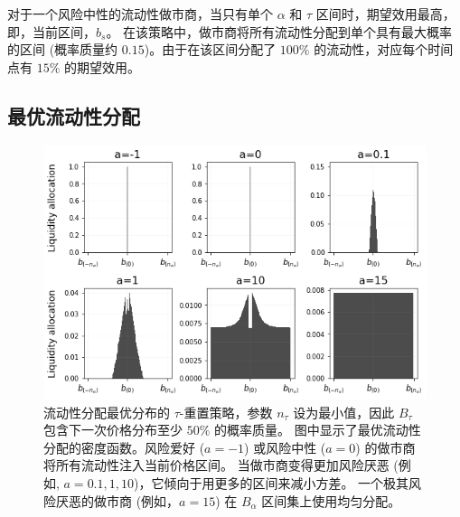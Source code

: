 \documentclass[sigconf, dvipsnames]{acmart}
\begin{document}
对于一个风险中性的流动性做市商，当只有单个 $\alpha$ 和 $\tau$ 区间时，期望效用最高，即，当前区间，$b_s$。
在该策略中，做市商将所有流动性分配到单个具有最大概率的区间 (概率质量约 $0.15$)。由于在该区间分配了 $100\%$ 的流动性，对应每个时间点有 $15\%$ 的期望效用。





\subsection{最优流动性分配}


\begin{figure}
    \centering
    \includegraphics[width=\linewidth]{img/optimal_allocs.png}
    \caption{流动性分配最优分布的 $\tau$-重置策略，参数 $n_{\tau}$ 设为最小值，因此 $B_\tau$ 包含下一次价格分布至少 $50\%$ 的概率质量。
    图中显示了最优流动性分配的密度函数。风险爱好 ($a=-1$) 或风险中性 ($a=0$) 的做市商将所有流动性注入当前价格区间。
    当做市商变得更加风险厌恶 (例如, $a=0.1,1,10$)，它倾向于用更多的区间来减小方差。
    一个极其风险厌恶的做市商 (例如，$a=15$) 在 $B_\alpha$ 区间集上使用均匀分配。
    \label{fig:optimal_allocs}}
\end{figure}
\end{document}
